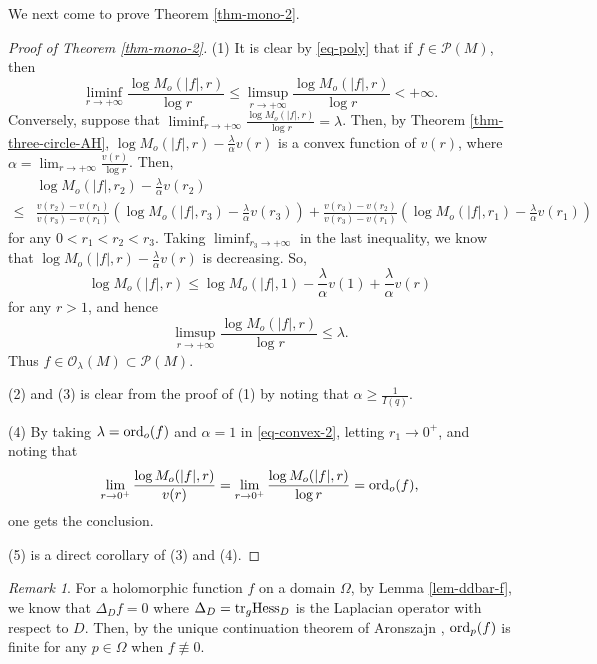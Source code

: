 \documentclass[12pt]{amsart}
\theoremstyle{definition}
\theoremstyle{remark}
\newtheorem{rem}{Remark}
\numberwithin{equation}{section}
\def\ord{{\rm ord}}
\def\Hess{{\rm Hess}}
\def\tr{{\rm tr}}
\def\D{\displaystyle}
\begin{document}
We next come to prove Theorem \ref{thm-mono-2}.
\begin{proof}[Proof of Theorem \ref{thm-mono-2}](1) It is clear by \eqref{eq-poly} that if $f\in \mathcal P(M)$, then
\begin{equation}
\liminf_{r\to +\infty}\frac{\log M_o(|f|,r)}{\log r}\leq \limsup_{r\to +\infty}\frac{\log M_o(|f|,r)}{\log r}<+\infty.
\end{equation}
Conversely, suppose that $\liminf_{r\to +\infty}\frac{\log M_o(|f|,r)}{\log r}=\lambda$. Then, by Theorem \ref{thm-three-circle-AH}, $\log M_o(|f|,r)-\frac{\lambda}{\alpha} v(r)$ is a convex function of $v(r)$, where $\alpha=\D\lim_{r\to+\infty}\frac{v(r)}{\log r}$. Then,
\begin{equation}\label{eq-convex-2}
\begin{split}
&\log M_o(|f|,r_2)-\frac{\lambda}{\alpha} v(r_2)\\
\leq& \frac{v(r_2)-v(r_1)}{v(r_3)-v(r_1)}\left(\log M_o(|f|,r_3)-\frac{\lambda}{\alpha} v(r_3)\right)+\frac{v(r_3)-v(r_2)}{v(r_3)-v(r_1)}\left(\log M_o(|f|,r_1)-\frac{\lambda}{\alpha} v(r_1)\right)
\end{split}
\end{equation}
for any $0<r_1<r_2<r_3$. Taking $\liminf_{r_3\to+\infty}$ in the last inequality, we know that $\log M_o(|f|,r)-\frac{\lambda}{\alpha}v(r)$ is decreasing. So,
\begin{equation}
\log M_o(|f|,r)\leq \log M_o(|f|,1)-\frac{\lambda}{\alpha}v(1)+\frac{\lambda}{\alpha}v(r)
\end{equation}
for any $r>1$, and hence
\begin{equation}
\limsup_{r\to+\infty}\frac{\log M_o(|f|,r)}{\log r}\leq \lambda.
\end{equation}
Thus $f\in \mathcal O_\lambda(M)\subset \mathcal P(M)$.

(2) and (3) is clear from the proof of (1) by noting that $\alpha\geq\frac1{I(q)}$.

(4) By taking $\lambda=\ord_o(f)$ and $\alpha=1$ in \eqref{eq-convex-2}, letting $r_1\to 0^+$, and noting that $$\lim_{r\to 0^+}\frac{\log M_o(|f|,r)}{v(r)}=\lim_{r\to 0^+}\frac{\log M_o(|f|,r)}{\log r}=\ord_o(f),$$ one  gets  the conclusion.

(5) is a direct corollary of (3) and (4).
\end{proof}
\begin{rem}
For a holomorphic function $f$ on a domain $\Omega$, by Lemma \ref{lem-ddbar-f}, we know that $\Delta_Df=0$ where $\Delta_D=\tr_g\Hess_D$ is the Laplacian operator with respect to $D$. Then, by the unique continuation theorem of Aronszajn \cite{Ar}, $\ord_p(f)$ is finite for any $p\in\Omega$ when $f\not\equiv 0$.  
\end{rem}
\end{document}
